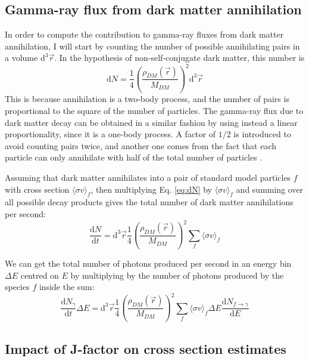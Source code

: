 \subsection{Gamma-ray flux from dark matter annihilation}
In order to compute the contribution to gamma-ray fluxes from dark matter annihilation, I will start by counting the number of possible annihilating pairs in a volume \(\mathrm{d}^3 \vec{r}\). In the hypothesis of non-self-conjugate dark matter, this number is
\begin{equation}\label{eq:dN}
	\mathrm{d} N = \frac{1}{4} \left( \frac{\rho_{DM} (\vec{r})}{M_{DM} } \right) ^2 \mathrm{d}^3 \vec{r}
\end{equation}
This is because annihilation is a two-body process, and the number of pairs is proportional to the square of the number of particles. The gamma-ray flux due to dark matter decay can be obtained in a similar fashion by using instead a linear proportionality, since it is a one-body process. A factor of \(1 /2\) is introduced to avoid counting pairs twice, and another one comes from the fact that each particle can only annihilate with half of the total number of particles \cite{Sala_2019}.

Assuming that dark matter annihilates into a pair of standard model particles \(f\) with cross section \(\langle \sigma v \rangle_f \), then multiplying Eq. \eqref{eq:dN} by \(\langle \sigma v \rangle_f \) and summing over all possible decay products gives the total number of dark matter annihilations per second:
\begin{equation}
	\frac{\mathrm{d}N}{\mathrm{d}t} = \mathrm{d} ^3 \vec{r} \frac{1}{4} \left( \frac{\rho_{DM} (\vec{r})}{M_{DM} } \right)^2 \sum_{f} \langle \sigma v \rangle_f
\end{equation}

We can get the total number of photons produced per second in an energy bin \(\Delta E\) centred on \(E\) by multiplying by the number of photons produced by the species \(f\) inside the sum:
\begin{equation}
	\frac{\mathrm{d}N_{\gamma } }{\mathrm{d}t}\Delta E = \mathrm{d} ^3 \vec{r} \frac{1}{4} \left( \frac{\rho_{DM} (\vec{r})}{M_{DM} } \right)^2 \sum_{f} \langle \sigma v \rangle_f \Delta E \frac{\mathrm{d}N_{f \to \gamma } }{\mathrm{d}E}    
\end{equation}

\subsection{Impact of J-factor on cross section estimates}

